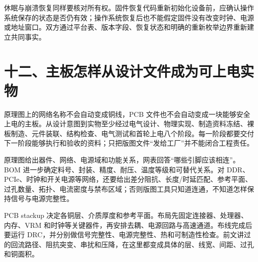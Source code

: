 休眠与崩溃恢复同样要核对所有权。固件恢复代码重新初始化设备前，应确认操作系统保存的状态是否仍有效；操作系统恢复后也不能假定固件没有改变时钟、电源或地址窗口。双方通过平台表、版本字段、恢复状态和明确的重新枚举边界重新建立共同事实。
\section{十二、主板怎样从设计文件成为可上电实物}

原理图上的网络名称不会自动变成铜线，PCB 文件也不会自动变成一块能够安全上电的主板。从设计意图到实物至少经过电气设计、物理实现、制造资料冻结、裸板制造、元件装联、结构检查、电气测试和首轮上电八个阶段。每一阶段都要交付下一阶段能够执行和验收的资料；只把版图文件“发给工厂”并不能闭合工程责任。


原理图给出器件、网络、电源域和功能关系，网表回答“哪些引脚应该相连”。BOM 进一步确定料号、封装、精度、耐压、温度等级和可替代关系。对 DDR、PCIe、时钟和开关电源等网络，还要给出差分阻抗、长度/时延匹配、参考平面、过孔数量、拓扑、电流密度与禁布区域；否则版图工具只知道连通，不知道怎样保持信号与电源完整性。

PCB stackup 决定各铜层、介质厚度和参考平面。布局先固定连接器、处理器、内存、VRM 和时钟等关键器件，再安排去耦、电源回路与高速通道。布线完成后要运行 DRC，并分别做信号完整性、电源完整性、热和可制造性检查。前文讲过的回流路径、阻抗突变、串扰和压降，在这里都变成具体的层、线宽、间距、过孔和铜面积。


